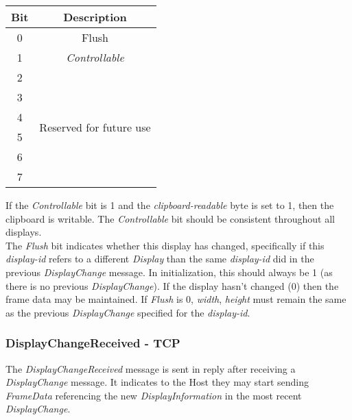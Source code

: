 \documentclass{article}
\begin{document}
    \begin{center}
        \begin{tabular}{|c|c|}
            \hline
            \textbf{Bit} & \textbf{Description}                        \\
            \hline
            0            & Flush                                       \\
            \hline
            1            & \emph{Controllable}                         \\
            \hline
            2            & \multirow{6}{10em}{Reserved for future use} \\
            3            &                                             \\
            4            &                                             \\
            5            &                                             \\
            6            &                                             \\
            7            &                                             \\
            \hline
        \end{tabular}
    \end{center}

    If the \emph{Controllable} bit is 1 and the \emph{clipboard-readable} byte is set to 1, then the clipboard is writable. The \emph{Controllable} bit should be consistent throughout all displays.\\

    The \emph{Flush} bit indicates whether this display has changed, specifically if this \emph{display-id} refers to a different \emph{Display} than the same \emph{display-id} did in the previous \emph{DisplayChange} message. In initialization, this should always be 1 (as there is no previous \emph{DisplayChange}). If the display hasn't changed (0) then the frame data may be maintained. If \emph{Flush} is 0, \emph{width}, \emph{height} must remain the same as the previous \emph{DisplayChange} specified for the \emph{display-id}.

    \subsubsection{DisplayChangeReceived - TCP}

    The \emph{DisplayChangeReceived} message is sent in reply after receiving a \emph{DisplayChange} message. It indicates to the Host they may start sending \emph{FrameData} referencing the new \emph{DisplayInformation} in the most recent \emph{DisplayChange}.
\end{document}
